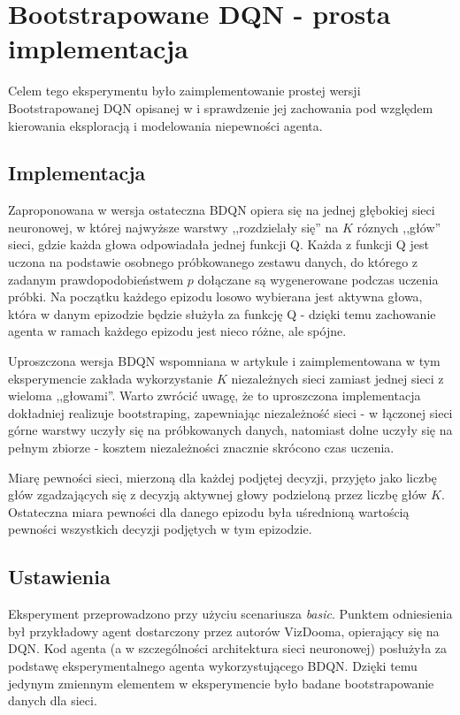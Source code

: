 \section{Bootstrapowane DQN - prosta implementacja}
Celem tego eksperymentu było zaimplementowanie prostej wersji Bootstrapowanej DQN opisanej w \cite{DBLP:journals/corr/OsbandBPR16} i sprawdzenie jej zachowania pod względem kierowania eksploracją i modelowania niepewności agenta.

\subsection{Implementacja}
Zaproponowana w \cite{DBLP:journals/corr/OsbandBPR16} wersja ostateczna BDQN opiera się na jednej głębokiej sieci neuronowej, w której najwyższe warstwy ,,rozdzielały się'' na $K$ róznych ,,głów'' sieci, gdzie każda głowa odpowiadała jednej funkcji Q. Każda z funkcji Q jest uczona na podstawie osobnego próbkowanego zestawu danych, do którego z zadanym prawdopodobieństwem $p$ dołączane są wygenerowane podczas uczenia próbki. Na początku każdego epizodu losowo wybierana jest aktywna głowa, która w danym epizodzie będzie służyła za funkcję Q - dzięki temu zachowanie agenta w ramach każdego epizodu jest nieco różne, ale spójne.

Uproszczona wersja BDQN wspomniana w artykule i zaimplementowana w tym eksperymencie zakłada wykorzystanie $K$ niezależnych sieci zamiast jednej sieci z wieloma ,,głowami''. Warto zwrócić uwagę, że to uproszczona implementacja dokładniej realizuje bootstraping, zapewniając niezależność sieci - w łączonej sieci górne warstwy uczyły się na próbkowanych danych, natomiast dolne uczyły się na pełnym zbiorze - kosztem niezależności znacznie skrócono czas uczenia.

Miarę pewności sieci, mierzoną dla każdej podjętej decyzji, przyjęto jako liczbę głów zgadzających się z decyzją aktywnej głowy podzieloną przez liczbę głów $K$. Ostateczna miara pewności dla danego epizodu była uśrednioną wartością pewności wszystkich decyzji podjętych w tym epizodzie.

\subsection{Ustawienia}
Eksperyment przeprowadzono przy użyciu scenariusza \textit{basic}. Punktem odniesienia był przykładowy agent dostarczony przez autorów VizDooma, opierający się na DQN. Kod agenta (a w szczególności architektura sieci neuronowej) posłużyła za podstawę eksperymentalnego agenta wykorzystującego BDQN. Dzięki temu jedynym zmiennym elementem w eksperymencie było badane bootstrapowanie danych dla sieci.

